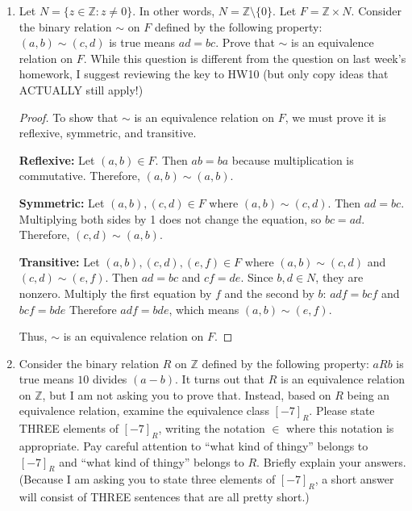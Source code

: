 \documentclass{article}
\begin{document}
\begin{enumerate}

\item 
Let $N = \{z \in \mathbb{Z} : z \not= 0\}$. In other words, $N = \mathbb{Z} \setminus \{0\}$. Let $F = \mathbb{Z} \times N$. Consider the binary relation $\sim$ on $F$ defined by the following property: $(a,b) \sim (c,d)$ is true means $ad=bc$. Prove that $\sim$ is an equivalence relation on $F$. While this question is different from the question on last week's homework, I suggest reviewing the key to HW10 (but only copy ideas that ACTUALLY still apply!)

\begin{proof}
    To show that $\sim$ is an equivalence relation on $F$, we must prove it is reflexive, symmetric, and transitive.

    \textbf{Reflexive:} Let $(a,b) \in F$. Then $ab = ba$ because multiplication is commutative. Therefore, $(a,b) \sim (a,b)$.

    \textbf{Symmetric:} Let $(a,b), (c,d) \in F$ where $(a,b) \sim (c,d)$. Then $ad = bc$. Multiplying both sides by 1 does not change the equation, so $bc = ad$. Therefore, $(c,d) \sim (a,b)$.

    \textbf{Transitive:} Let $(a,b), (c,d), (e,f) \in F$ where $(a,b) \sim (c,d)$ and $(c,d) \sim (e,f)$. Then $ad = bc$ and $cf = de$. 
    Since $b,d \in N$, they are nonzero. Multiply the first equation by $f$ and the second by $b$:
    $adf = bcf$ and $bcf = bde$
    Therefore $adf = bde$, which means $(a,b) \sim (e,f)$.

    Thus, $\sim$ is an equivalence relation on $F$.
\end{proof}

\newpage

\item 
Consider the binary relation $R$ on $\mathbb{Z}$ defined by the following property: $aRb$ is true means $10$ divides $(a-b)$. It turns out that $R$ is an equivalence relation on $\mathbb{Z}$, but I am not asking you to prove that. Instead, based on $R$ being an equivalence relation, examine the equivalence class ${[-7]}_R$. Please state THREE elements of ${[-7]}_R$, writing the notation $\in$ where this notation is appropriate. Pay careful attention to ``what kind of thingy'' belongs to ${[-7]}_R$ and ``what kind of thingy'' belongs to $R$. Briefly explain your answers. (Because I am asking you to state three elements of ${[-7]}_R$, a short answer will consist of THREE sentences that are all pretty short.)


\end{enumerate}
\end{document}
